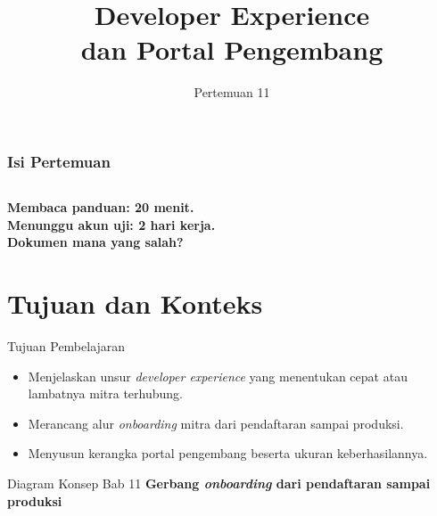 \documentclass[aspectratio=169, table, 12pt]{beamer}
\title{\Huge Developer Experience\\ \vspace{10pt} dan Portal Pengembang}
\date{Pertemuan 11}
\begin{document}
\frame{\titlepage}

\begin{frame}
  \frametitle{Isi Pertemuan}
  \vspace{14pt}
  \begin{columns}[t]
    {\small\tableofcontents[sections={1-5}]}

    {\small\tableofcontents[sections={6-10}]}
  \end{columns}
\end{frame}

\begin{frame}{\hfill}
  \centering
  \Huge{\textbf{Membaca panduan: 20 menit.\\Menunggu akun uji: 2 hari kerja.\\Dokumen mana yang salah?}}
\end{frame}

\section{Tujuan dan Konteks}

\begin{frame}{{\Large Tujuan Pembelajaran}}
  \vspace{10pt}
  \begin{itemize}
    \item Menjelaskan unsur \textit{developer experience} yang menentukan cepat atau lambatnya mitra terhubung.
    \item Merancang alur \textit{onboarding} mitra dari pendaftaran sampai produksi.
    \item Menyusun kerangka portal pengembang beserta ukuran keberhasilannya.
  \end{itemize}
\end{frame}

\begin{frame}{{\Large Diagram Konsep Bab 11}}
  \centering
  {\small\bfseries Gerbang \textit{onboarding} dari pendaftaran sampai produksi}\par\medskip
\end{frame}
\end{document}
